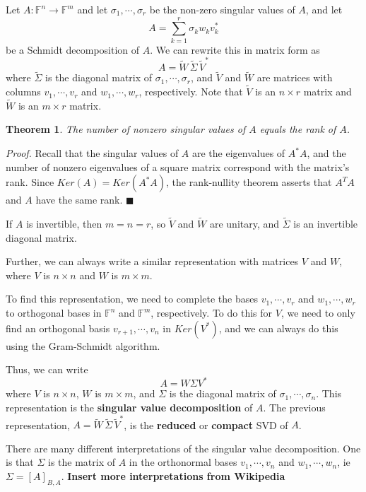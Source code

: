 \documentclass[a4paper,10pt]{book}
\newcommand{\F}{\mathbb{F}}
\theoremstyle{plain}
\newtheorem{theorem}{Theorem}[section]
\renewenvironment{proof}{\textsl{Proof.}}{\hfill$\blacksquare$}
\theoremstyle{plain}
\theoremstyle{definition}
\begin{document}
Let $A : \F^{n} \rightarrow \F^{m}$ and let $\sigma_{1}, \cdots, \sigma_{r}$ be the non-zero singular values of $A$, and let 
$$A = \sum_{k=1}^{r} \sigma_{k} w_{k} v_{k}^{*}$$ 
be a Schmidt decomposition of $A$. We can rewrite this in matrix form as 
$$A = \widetilde{W} \, \widetilde{\Sigma} \, \widetilde{V}^{*}$$
where $\widetilde{\Sigma}$ is the diagonal matrix of $\sigma_{1}, \cdots, \sigma_{r}$, and $\widetilde{V}$ and $\widetilde{W}$ are matrices with columns $v_{1}, \cdots, v_{r}$ and $w_{1}, \cdots, w_{r}$, respectively. Note that $\widetilde{V}$ is an $n \times r$ matrix and $\widetilde{W}$ is an $m \times r$ matrix. 

\begin{theorem}
The number of nonzero singular values of $A$ equals the rank of $A$.
\end{theorem}

\begin{proof}
Recall that the singular values of $A$ are the eigenvalues of $A^{*}A$, and the number of nonzero eigenvalues of a square matrix correspond with the matrix's rank.  Since $Ker(A) = Ker(A^{*}A)$, the rank-nullity theorem asserts that $A^{T}A$ and $A$ have the same rank. 
\end{proof}

If $A$ is invertible, then $m = n = r$, so $\widetilde{V}$ and $\widetilde{W}$ are unitary, and $\widetilde{\Sigma}$ is an invertible diagonal matrix. 

Further, we can always write a similar representation with matrices $V$ and $W$, where $V$ is $n \times n$ and $W$ is $m \times m$. 

To find this representation, we need to complete the bases $v_{1}, \cdots, v_{r}$ and $w_{1}, \cdots, w_{r}$ to orthogonal bases in $\F^{n}$ and $\F^{m}$, respectively. To do this for $V$, we need to only find an orthogonal basis $v_{r+1}, \cdots, v_{n}$ in $Ker(V^{*})$, and we can always do this using the Gram-Schmidt algorithm. 

Thus, we can write 
$$A = W \Sigma V^{*}$$
where $V$ is $n \times n$, $W$ is $m \times m$, and $\Sigma$ is the diagonal matrix of $\sigma_{1}, \cdots, \sigma_{n}$. This representation is the \textbf{singular value decomposition} of $A$. The previous representation, $A = \widetilde{W} \, \widetilde{\Sigma} \, \widetilde{V}^{*}$, is the \textbf{reduced} or \textbf{compact} SVD of $A$.

There are many different interpretations of the singular value decomposition. One is that $\Sigma$ is the matrix of $A$ in the orthonormal bases $v_{1}, \cdots, v_{n}$ and $w_{1}, \cdots, w_{n}$, ie $\Sigma = [A]_{B, A}$. \textbf{Insert more interpretations from Wikipedia}
\end{document}
